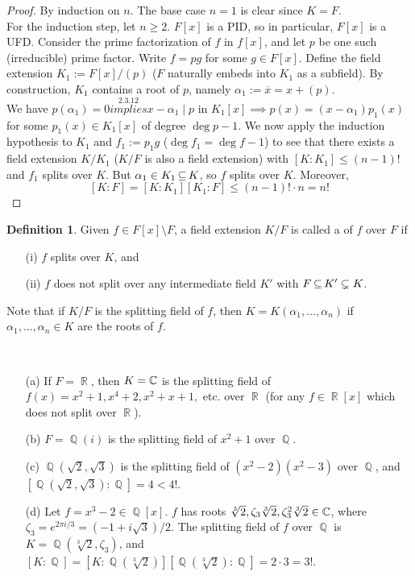 \documentclass[11pt]{book}
\theoremstyle{definition}   \newtheorem{defn}[counter]{Definition} %
\newcommand{\ov}{\overline}   \newcommand{\wt}{\widetilde}
\newcommand{\bs}{\setminus}   \newcommand{\A}{\mathcal{A}}   \newcommand{\sy}{\textnormal{Syl}}   \newcommand{\size}[1]{\left| #1 \right|}
\DeclareMathOperator{\R}{\mathbb{R}}   \DeclareMathOperator{\N}{\mathbb{N}}   \DeclareMathOperator{\z}{\mathbb{Z}}   \DeclareMathOperator{\Q}{\mathbb{Q}}
\newcommand{\vs}{\vspace{8pt}}   \newcommand{\hs}{\hspace{8pt}}
\numberwithin{counter}{chapter}
\begin{document}
\begin{proof}
By induction on $n$. The base case $n=1$ is clear since $K = F$. \\

For the induction step, let $n \geq 2$. $F[x]$ is a PID, so in particular, $F[x]$ is a UFD. Consider the prime factorization of $f$ in $f[x]$, and let $p$ be one such (irreducible) prime factor. Write $f = p g$ for some $g \in F[x]$. Define the field extension $K_1 := F[x]/(p)$ ($F$ naturally embeds into $K_1$ as a subfield). By construction, $K_1$ contains a root of $p$, namely $\alpha_1 := \ov{x} = x + (p)$. \\

We have $p(\alpha_1) = 0 \overset{2.3.12}{implies} x-\alpha_1 \mid p$ in $K_1[x] \implies p(x) = (x-\alpha_1) p_1(x)$ for some $p_1(x) \in K_1[x]$ of degree $\deg p - 1$. We now apply the induction hypothesis to $K_1$ and $f_1 := p_1 g$ ($\deg f_1 = \deg f - 1$) to see that there exists a field extension $K/K_1$ ($K/F$ is also a field extension) with $[K : K_1] \leq (n-1)!$ and $f_1$ splits over $K$. But $\alpha_1 \in K_1 \operatorname{\subseteq} K$, so $f$ splits over $K$. Moreover, 
	\[[K : F] = [K : K_1] [K_1 : F] \leq (n-1)! \cdot n = n! \]
\end{proof}

\vs

\begin{defn}
Given $f \in F[x] \bs F$, a field extension $K/F$ is called a  of $f$ over $F$ if
\begin{enumerate}
\item[(i)] $f$ splits over $K$, and
\item[(ii)] $f$ does not split over any intermediate field $K'$ with $F \operatorname{\subseteq} K' \subsetneq K$.
\end{enumerate}
Note that if $K/F$ is the splitting field of $f$, then $K = K(\alpha_1,\dots,\alpha_n)$ if $\alpha_1,\dots,\alpha_n \in K$ are the roots of $f$.  
\end{defn}

\vs

\begin{example}\ 
\begin{enumerate}
\item[(a)] If $F = \R$, then $K = \operatorname{\mathbb{C}}$ is the splitting field of $f(x) = x^2+1, x^4+2, x^2+x+1,$ etc. over $\R$ (for any $f \in \R[x]$ which does not split over $\R$). 
\item[(b)] $F = \Q(i)$ is the splitting field of $x^2 + 1$ over $\Q$. 
\item[(c)] $\Q(\sqrt{2},\sqrt{3})$ is the splitting field of $(x^2-2)(x^2-3)$ over $\Q$, and $[\Q(\sqrt{2},\sqrt{3}) : \Q] = 4 < 4!$. 
\item[(d)] Let $f = x^3-2 \in \Q[x]$. $f$ has roots $\sqrt[3]{2}, \zeta_3 \sqrt[3]{2}, \zeta_3^2 \sqrt[3]{2} \in \operatorname{\mathbb{C}}$, where \\ $\zeta_3 = e^{2 \pi i/3} =(-1 + i \sqrt{3})/2$. The splitting field of $f$ over $\Q$ is $K = \Q(\sqrt[3]{2},\zeta_3)$, and \\ $[K : \Q] = [K : \Q(\sqrt[3]{2})] [\Q(\sqrt[3]{2}) : \Q] = 2 \cdot 3 = 3!$. 
\end{enumerate}
\end{example}
\end{document}
